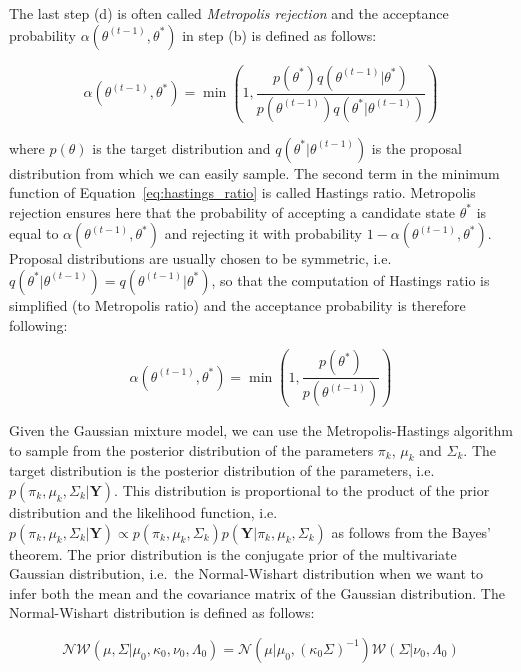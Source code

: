 The last step (d) is often called \textit{Metropolis rejection} and the acceptance probability $\alpha(\theta^{(t-1)},\theta^*)$ in step (b) is defined as follows:

\begin{equation} \label{eq:hastings_ratio}
    \alpha(\theta^{(t-1)},\theta^*) = \min \left(1,\frac{p(\theta^*)q(\theta^{(t-1)}|\theta^*)}{p(\theta^{(t-1)})q(\theta^*|\theta^{(t-1)})}\right)
\end{equation}

where $p(\theta)$ is the target distribution and $q(\theta^*|\theta^{(t-1)})$ is the proposal distribution from which we can easily sample.
The second term in the minimum function of Equation~\ref{eq:hastings_ratio} is called Hastings ratio. Metropolis rejection ensures here that 
the probability of accepting a candidate state $\theta^*$ is equal to $\alpha(\theta^{(t-1)},\theta^*)$ and rejecting it with probability $1 - \alpha(\theta^{(t-1)},\theta^*)$.
Proposal distributions are usually chosen to be symmetric, i.e. $q(\theta^*|\theta^{(t-1)}) = q(\theta^{(t-1)}|\theta^*)$, 
so that the computation of Hastings ratio is simplified (to Metropolis ratio) and the acceptance probability is therefore following:

\begin{equation}
    \alpha(\theta^{(t-1)},\theta^*) = \min \left(1,\frac{p(\theta^*)}{p(\theta^{(t-1)})}\right)
\end{equation}

Given the Gaussian mixture model, we can use the Metropolis-Hastings algorithm to sample from the posterior distribution of the parameters $\pi_k$, $\mu_k$ and $\Sigma_k$. 
The target distribution is the posterior distribution of the parameters, i.e. $p(\pi_k,\mu_k,\Sigma_k|\textbf{Y})$.
This distribution is proportional to the product of the prior distribution and the likelihood function, i.e. $p(\pi_k,\mu_k,\Sigma_k|\textbf{Y}) \propto p(\pi_k,\mu_k,\Sigma_k)p(\textbf{Y}|\pi_k,\mu_k,\Sigma_k)$ as follows from the Bayes' theorem.
The prior distribution is the conjugate prior of the multivariate Gaussian distribution, i.e.\ the Normal-Wishart distribution when we want to infer both the mean and the covariance matrix of the Gaussian distribution.
The Normal-Wishart distribution is defined as follows:

\begin{equation}
    \mathcal{NW}(\mu,\Sigma|\mu_0,\kappa_0,\nu_0,\Lambda_0) = \mathcal{N}(\mu|\mu_0,{(\kappa_0\Sigma)}^{-1})\mathcal{W}(\Sigma|\nu_0,\Lambda_0)
\end{equation}


